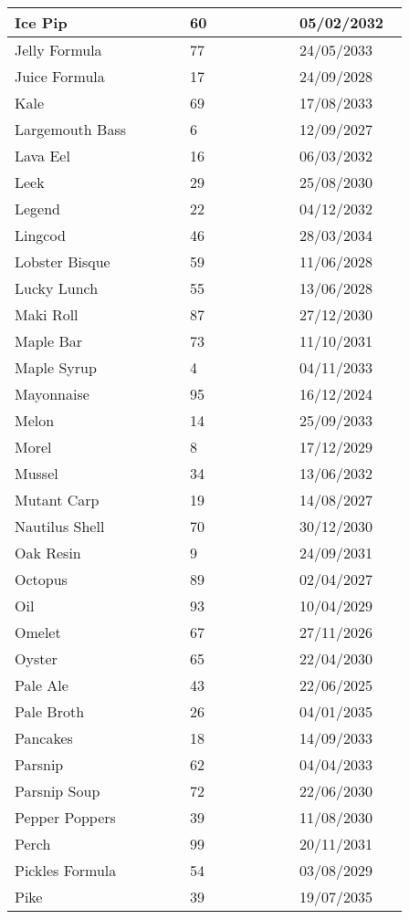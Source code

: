 \documentclass{article}
\begin{document}
\begin{longtable}{|p{0.4\linewidth}|p{0.25\linewidth}|p{0.25\linewidth}|}
Ice Pip & 60 & 05/02/2032 \\
\hline
Jelly Formula & 77 & 24/05/2033 \\
\hline
Juice Formula & 17 & 24/09/2028 \\
\hline
Kale & 69 & 17/08/2033 \\
\hline
Largemouth Bass & 6 & 12/09/2027 \\
\hline
Lava Eel & 16 & 06/03/2032 \\
\hline
Leek & 29 & 25/08/2030 \\
\hline
Legend & 22 & 04/12/2032 \\
\hline
Lingcod & 46 & 28/03/2034 \\
\hline
Lobster Bisque & 59 & 11/06/2028 \\
\hline
Lucky Lunch & 55 & 13/06/2028 \\
\hline
Maki Roll & 87 & 27/12/2030 \\
\hline
Maple Bar & 73 & 11/10/2031 \\
\hline
Maple Syrup & 4 & 04/11/2033 \\
\hline
Mayonnaise & 95 & 16/12/2024 \\
\hline
Melon & 14 & 25/09/2033 \\
\hline
Morel & 8 & 17/12/2029 \\
\hline
Mussel & 34 & 13/06/2032 \\
\hline
Mutant Carp & 19 & 14/08/2027 \\
\hline
Nautilus Shell & 70 & 30/12/2030 \\
\hline
Oak Resin & 9 & 24/09/2031 \\
\hline
Octopus & 89 & 02/04/2027 \\
\hline
Oil & 93 & 10/04/2029 \\
\hline
Omelet & 67 & 27/11/2026 \\
\hline
Oyster & 65 & 22/04/2030 \\
\hline
Pale Ale & 43 & 22/06/2025 \\
\hline
Pale Broth & 26 & 04/01/2035 \\
\hline
Pancakes & 18 & 14/09/2033 \\
\hline
Parsnip & 62 & 04/04/2033 \\
\hline
Parsnip Soup & 72 & 22/06/2030 \\
\hline
Pepper Poppers & 39 & 11/08/2030 \\
\hline
Perch & 99 & 20/11/2031 \\
\hline
Pickles Formula & 54 & 03/08/2029 \\
\hline
Pike & 39 & 19/07/2035 \\

\end{longtable}
\end{document}
